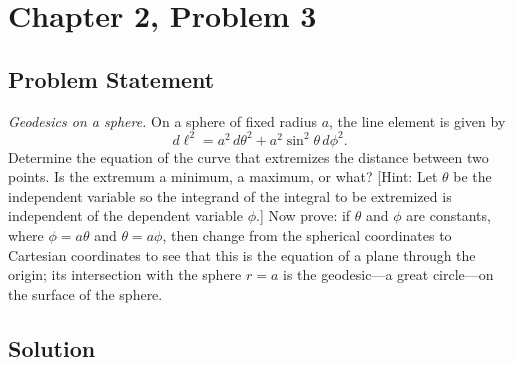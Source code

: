 \documentclass[12pt]{article}
\begin{document}
\section*{Chapter 2, Problem 3}

\subsection*{Problem Statement}
\textit{Geodesics on a sphere.} On a sphere of fixed radius $a$, the line element is given by
\[
  d\ell^2 = a^2\,d\theta^2 + a^2\sin^2\theta\,d\phi^2.
\]
Determine the equation of the curve that extremizes the distance between two points. Is the extremum a minimum, a maximum, or what? [Hint: Let $\theta$ be the independent variable so the integrand of the integral to be extremized is independent of the dependent variable $\phi$.] Now prove: if $\theta$ and $\phi$ are constants, where $\phi = a\theta$ and $\theta = a\phi$, then change from the spherical coordinates to Cartesian coordinates to see that this is the equation of a plane through the origin; its intersection with the sphere $r = a$ is the geodesic---a great circle---on the surface of the sphere.

\subsection*{Solution}
\end{document}
